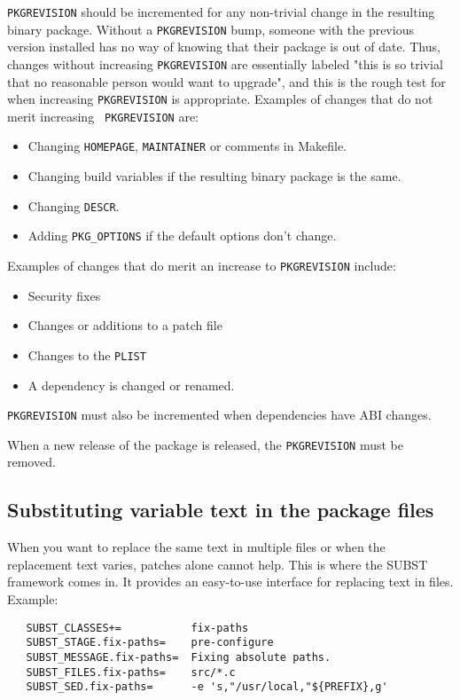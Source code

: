 {\tt PKGREVISION} should be incremented for any non-trivial change in the
resulting binary package. Without a {\tt PKGREVISION} bump, someone with the
previous version installed has no way of knowing that their package is out
of date. Thus, changes without increasing {\tt PKGREVISION} are essentially
labeled "this is so trivial that no reasonable person would want to
upgrade", and this is the rough test for when increasing {\tt PKGREVISION}
is appropriate. Examples of changes that do not merit increasing {\tt
PKGREVISION} are:
\begin{itemize}
   \item Changing {\tt HOMEPAGE}, {\tt MAINTAINER} or comments in Makefile.
   \item Changing build variables if the resulting binary package is the same.
   \item Changing {\tt DESCR}.
   \item Adding {\tt PKG\_OPTIONS} if the default options don't change.
\end{itemize}

Examples of changes that do merit an increase to {\tt PKGREVISION} include:
\begin{itemize}
   \item Security fixes
   \item Changes or additions to a patch file
   \item Changes to the {\tt PLIST}
   \item A dependency is changed or renamed.
\end{itemize}

{\tt PKGREVISION} must also be incremented when dependencies have ABI changes.

When a new release of the package is released, the {\tt PKGREVISION} must be
removed.


\subsection{Substituting variable text in the package files} %
\label{section:genvars:SUBST}

When you want to replace the same text in multiple files or when the
replacement text varies, patches alone cannot help. This is where the SUBST
framework comes in. It provides an easy-to-use interface for replacing text in
files. Example:
\begin{verbatim}
   SUBST_CLASSES+=           fix-paths
   SUBST_STAGE.fix-paths=    pre-configure
   SUBST_MESSAGE.fix-paths=  Fixing absolute paths.
   SUBST_FILES.fix-paths=    src/*.c
   SUBST_SED.fix-paths=      -e 's,"/usr/local,"${PREFIX},g'
\end{verbatim}

